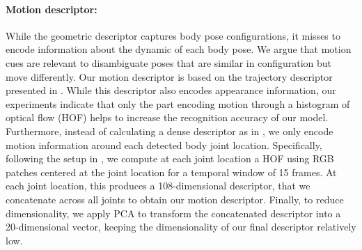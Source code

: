 \paragraph{\textbf{Motion descriptor:}}
While the geometric descriptor captures body pose configurations, it misses to encode
information about the dynamic of each body pose. We argue that motion cues are relevant to 
disambiguate poses that are similar in configuration but move 
differently. Our motion descriptor is based on the trajectory descriptor 
presented in \cite{WangCVPR2011}. While this descriptor also encodes appearance information, our 
experiments indicate that only the part encoding motion through a histogram of optical 
flow (HOF) helps to increase the recognition accuracy of our model. Furthermore, instead of 
calculating a dense descriptor as in \cite{WangCVPR2011}, we only 
encode motion information around each detected body joint location. 
Specifically, following the setup in \cite{WangCVPR2011}, we compute at each joint location a 
HOF using RGB patches centered at the joint location for a 
temporal window of 
15 frames. At each joint location, this produces a 108-dimensional descriptor,  
that we concatenate across all joints to obtain our motion descriptor. Finally, to reduce 
dimensionality, we apply PCA to transform the concatenated descriptor into a 
20-dimensional vector, keeping the dimensionality of our final descriptor 
relatively low.
